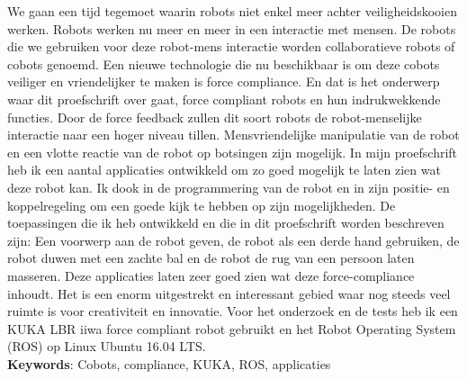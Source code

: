 We gaan een tijd tegemoet waarin robots niet enkel meer achter veiligheidskooien werken. Robots werken nu meer en meer in een interactie met mensen. De robots die we gebruiken voor deze robot-mens interactie worden collaboratieve robots of cobots genoemd. Een nieuwe technologie die nu beschikbaar is om deze cobots veiliger en vriendelijker te maken is force compliance. En dat is het onderwerp waar dit proefschrift over gaat, force compliant robots en hun indrukwekkende functies. Door de force feedback zullen dit soort robots de robot-menselijke interactie naar een hoger niveau tillen. Mensvriendelijke manipulatie van de robot en een vlotte reactie van de robot op botsingen zijn mogelijk. In mijn proefschrift heb ik een aantal applicaties ontwikkeld om zo goed mogelijk te laten zien wat deze robot kan. Ik dook in de programmering van de robot en in zijn positie- en koppelregeling om een ​​goede kijk te hebben op zijn mogelijkheden. De toepassingen die ik heb ontwikkeld en die in dit proefschrift worden beschreven zijn: Een voorwerp aan de robot geven, de robot als een derde hand gebruiken, de robot duwen met een zachte bal en de robot de rug van een persoon laten masseren. Deze applicaties laten zeer goed zien wat deze force-compliance inhoudt. Het is een enorm uitgestrekt en interessant gebied waar nog steeds veel ruimte is voor creativiteit en innovatie. Voor het onderzoek en de tests heb ik een KUKA LBR iiwa force compliant robot gebruikt en het Robot Operating System (ROS) op Linux Ubuntu 16.04 LTS.\\

\textbf{Keywords}: Cobots, compliance, KUKA, ROS, applicaties
